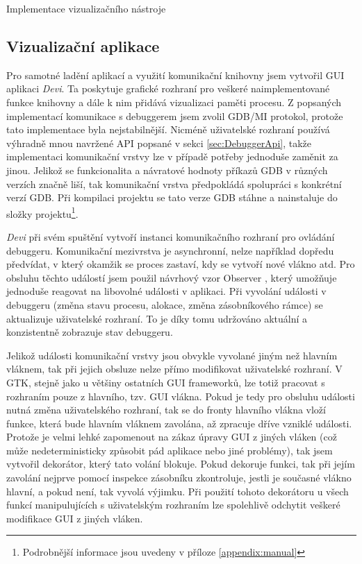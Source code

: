\documentclass[czech,bachelor,male,python,dept460,hidelinks]{diploma}						%
\newcommand{\parspace}[1][]{
	\ifthenelse{\isempty{#1}}{\vspace{5mm}}{\vspace{#1}}
	\par
}
\begin{document}
\begin{section}{Implementace vizualizačního nástroje}
	\subsection{Vizualizační aplikace}
	Pro samotné ladění aplikací a využití komunikační knihovny jsem vytvořil GUI aplikaci \textit{Devi}.
	Ta poskytuje grafické rozhraní pro veškeré naimplementované funkce knihovny a dále k nim přidává vizualizaci paměti procesu.
	Z popsaných implementací komunikace s debuggerem jsem zvolil GDB/MI protokol, protože tato implementace byla nejstabilnější.
	Nicméně uživatelské rozhraní používá výhradně mnou navržené API popsané v sekci \ref{sec:DebuggerApi}, takže implementaci komunikační vrstvy
	lze v případě potřeby jednoduše zaměnit za jinou. Jelikož se funkcionalita a návratové hodnoty příkazů GDB v různých verzích značně liší, tak komunikační vrstva
	předpokládá spolupráci s konkrétní verzí GDB. Při kompilaci projektu se tato verze GDB stáhne a nainstaluje do složky
	projektu\footnote{Podrobnější informace jsou uvedeny v příloze \ref{appendix:manual}}.
	
	
	\parspace \textit{Devi} při svém spuštění vytvoří instanci komunikačního rozhraní pro ovládání debuggeru. Komunikační mezivrstva je asynchronní,
	nelze například dopředu předvídat, v který okamžik se proces zastaví, kdy se vytvoří nové vlákno atd. Pro obsluhu těchto událostí jsem použil návrhový vzor
	Observer \cite[326]{gof}, který umožňuje jednoduše reagovat na libovolné události v aplikaci. Při vyvolání události v debuggeru (změna stavu procesu,
	alokace, změna zásobníkového rámce) se aktualizuje uživatelské rozhraní. To je díky tomu udržováno aktuální a konzistentně zobrazuje
	stav debuggeru.
	
	\parspace Jelikož události komunikační vrstvy jsou obvykle vyvolané jiným než hlavním vláknem, tak při jejich obsluze nelze přímo modifikovat uživatelské
	rozhraní. V GTK, stejně jako u většiny ostatních GUI frameworků, lze totiž pracovat s rozhraním pouze z hlavního, tzv. GUI vlákna. Pokud je tedy pro
	obsluhu události nutná změna uživatelského rozhraní, tak se do fronty hlavního vlákna vloží funkce, která bude hlavním vláknem zavolána,
	až zpracuje dříve vzniklé události. Protože je velmi lehké zapomenout na zákaz úpravy GUI z jiných vláken (což může nedeterministicky způsobit pád
	aplikace nebo jiné problémy), tak jsem vytvořil dekorátor, který tato volání blokuje. Pokud dekoruje funkci, tak při jejím zavolání
	nejprve pomocí inspekce zásobníku zkontroluje, jestli je současné vlákno hlavní, a pokud není, tak vyvolá výjimku. Při použití tohoto dekorátoru u všech
	funkcí manipulujících s uživatelským rozhraním lze spolehlivě odchytit veškeré modifikace GUI z jiných vláken.
	

\end{section}
\end{document}
